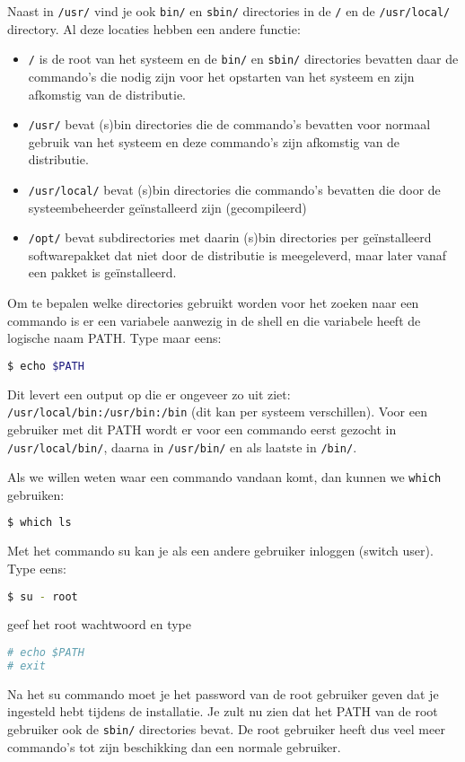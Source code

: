 Naast in \texttt{/usr/} vind je ook \texttt{bin/} en \texttt{sbin/} directories in de \texttt{/} en de \texttt{/usr/local/} directory. Al deze locaties hebben een andere functie:
\begin{itemize}
	\item \texttt{/} is de root van het systeem en de \texttt{bin/} en \texttt{sbin/} directories bevatten daar de commando's die nodig zijn voor het opstarten van het systeem en zijn afkomstig van de distributie.
	\item \texttt{/usr/} bevat (s)bin directories die de commando's bevatten voor normaal gebruik van het systeem en deze commando's zijn afkomstig van de distributie.
	\item \texttt{/usr/local/} bevat (s)bin directories die commando's bevatten die door de systeembeheerder ge\"installeerd zijn (gecompileerd)
	\item \texttt{/opt/} bevat subdirectories met daarin (s)bin directories per ge\"installeerd softwarepakket dat niet door de distributie is meegeleverd, maar later vanaf een pakket is ge\"installeerd.
\end{itemize}

Om te bepalen welke directories gebruikt worden voor het zoeken naar een commando is er een variabele aanwezig in de shell en die variabele heeft de logische naam PATH. Type maar eens:
\begin{lstlisting}[language=bash]
$ echo $PATH
\end{lstlisting}
Dit levert een output op die er ongeveer zo uit ziet: \texttt{/usr/local/bin:/usr/bin:/bin} (dit kan per systeem verschillen). Voor een gebruiker met dit PATH wordt er voor een commando eerst gezocht in \texttt{/usr/local/bin/}, daarna in \texttt{/usr/bin/} en als laatste in \texttt{/bin/}.

Als we willen weten waar een commando vandaan komt, dan kunnen we \texttt{which} gebruiken:
\begin{lstlisting}[language=bash]
$ which ls
\end{lstlisting}

Met het commando su kan je als een andere gebruiker inloggen (switch user). Type eens:
\begin{lstlisting}[language=bash]
$ su - root
\end{lstlisting}
geef het root wachtwoord en type
\begin{lstlisting}[language=bash]
# echo $PATH
# exit
\end{lstlisting}
Na het su commando moet je het password van de root gebruiker geven dat je ingesteld hebt tijdens de installatie. Je zult nu zien dat het PATH van de root gebruiker ook de \texttt{sbin/} directories bevat. De root gebruiker heeft dus veel meer commando's tot zijn beschikking dan een normale gebruiker.

